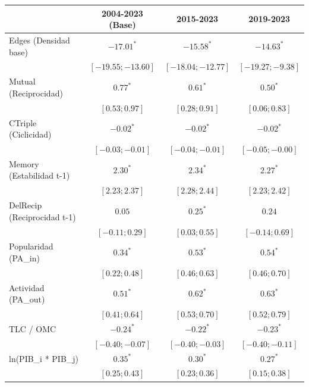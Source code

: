 
\begin{table}
\begin{center}
\begin{tabular}{l c c c}
\hline
 & 2004-2023 (Base) & 2015-2023 & 2019-2023 \\
\hline
Edges (Densidad base)       & $-17.01^{*}$        & $-15.58^{*}$        & $-14.63^{*}$       \\
                            & $ [-19.55; -13.60]$ & $ [-18.04; -12.77]$ & $ [-19.27; -9.38]$ \\
Mutual (Reciprocidad)       & $0.77^{*}$          & $0.61^{*}$          & $0.50^{*}$         \\
                            & $ [  0.53;   0.97]$ & $ [  0.28;   0.91]$ & $ [  0.06;  0.83]$ \\
CTriple (Ciclicidad)        & $-0.02^{*}$         & $-0.02^{*}$         & $-0.02^{*}$        \\
                            & $ [ -0.03;  -0.01]$ & $ [ -0.04;  -0.01]$ & $ [ -0.05; -0.00]$ \\
Memory (Estabilidad t-1)    & $2.30^{*}$          & $2.34^{*}$          & $2.27^{*}$         \\
                            & $ [  2.23;   2.37]$ & $ [  2.28;   2.44]$ & $ [  2.23;  2.42]$ \\
DelRecip (Reciprocidad t-1) & $0.05$              & $0.25^{*}$          & $0.24$             \\
                            & $ [ -0.11;   0.29]$ & $ [  0.03;   0.55]$ & $ [ -0.14;  0.69]$ \\
Popularidad (PA\_in)        & $0.34^{*}$          & $0.53^{*}$          & $0.54^{*}$         \\
                            & $ [  0.22;   0.48]$ & $ [  0.46;   0.63]$ & $ [  0.46;  0.70]$ \\
Actividad (PA\_out)         & $0.51^{*}$          & $0.62^{*}$          & $0.63^{*}$         \\
                            & $ [  0.41;   0.64]$ & $ [  0.53;   0.70]$ & $ [  0.52;  0.79]$ \\
TLC / OMC                   & $-0.24^{*}$         & $-0.22^{*}$         & $-0.23^{*}$        \\
                            & $ [ -0.40;  -0.07]$ & $ [ -0.40;  -0.03]$ & $ [ -0.40; -0.11]$ \\
ln(PIB\_i * PIB\_j)         & $0.35^{*}$          & $0.30^{*}$          & $0.27^{*}$         \\
                            & $ [  0.25;   0.43]$ & $ [  0.23;   0.36]$ & $ [  0.15;  0.38]$ \\

\end{tabular}
\end{center}
\end{table}
